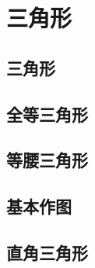 \chapter{三角形}

\section{三角形}





\section{全等三角形}






\section{等腰三角形}




\section{基本作图}




\section{直角三角形}




